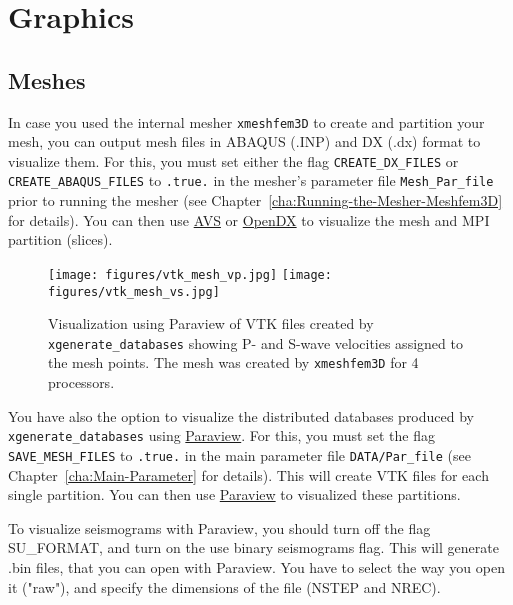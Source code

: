 \chapter{Graphics}

\section{Meshes}\label{sec:Mesh-graphics}

In case you used the internal mesher \texttt{xmeshfem3D} to create
and partition your mesh, you can output mesh files in ABAQUS (.INP)
and DX (.dx) format to visualize them. For this, you must set either
the flag \texttt{CREATE\_DX\_FILES} or \texttt{CREATE\_ABAQUS\_FILES}
to \texttt{.true.} in the mesher's parameter file \texttt{Mesh\_Par\_file}
prior to running the mesher (see Chapter~\ref{cha:Running-the-Mesher-Meshfem3D}
for details). You can then use \href{www.avs.com}{AVS}
or \href{www.opendx.org}{OpenDX} to visualize the mesh
and MPI partition (slices).

\begin{figure}[htbp]
\noindent \begin{centering}
\texttt{[image: figures/vtk\_mesh\_vp.jpg]}
\texttt{[image: figures/vtk\_mesh\_vs.jpg]}
\par\end{centering}

\caption{Visualization using Paraview of VTK files created by \texttt{xgenerate\_databases}
showing P- and S-wave velocities assigned to the mesh points. The
mesh was created by \texttt{xmeshfem3D} for 4 processors.}


\label{fig:vtk.mesh}
\end{figure}


You have also the option to visualize the distributed databases produced
by \texttt{xgenerate\_databases} using \href{www.paraview.org}{Paraview}.
For this, you must set the flag \texttt{SAVE\_MESH\_FILES} to \texttt{.true.}
in the main parameter file \texttt{DATA/Par\_file} (see Chapter~\ref{cha:Main-Parameter}
for details). This will create VTK files for each single partition.
You can then use \href{www.paraview.org}{Paraview}
to visualized these partitions.\newline

{\red To visualize seismograms with Paraview, you should turn off the flag SU\_FORMAT, and turn on the use binary seismograms flag. This will generate .bin files, that you can open with Paraview. You have to select the way you open it ("raw"), and specify the dimensions of the file (NSTEP and NREC).}

